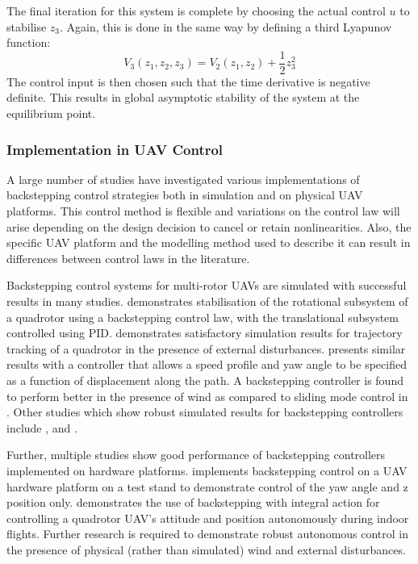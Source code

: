 The final iteration for this system is complete by choosing the actual control $u$ to stabilise $z_{3}$. Again, this is done in the same way by defining a third Lyapunov function:
\begin{equation*}
V_{3}(z_{1},z_{2},z_{3})=V_{2}(z_{1},z_{2})+\frac{1}{2}z_{3}^{2}
\end{equation*}
The control input is then chosen such that the time derivative is negative definite. This results in global asymptotic stability of the system at the equilibrium point.


\subsubsection{Implementation in UAV Control}

A large number of studies have investigated various implementations of backstepping control strategies both in simulation and on physical UAV platforms. This control method is flexible and variations on the control law will arise depending on the design decision to cancel or retain nonlinearities. Also, the specific UAV platform and the modelling method used to describe it can result in differences between control laws in the literature.

Backstepping control systems for multi-rotor UAVs are simulated with successful results in many studies. \cite{Mian2008} demonstrates stabilisation of the rotational subsystem of a quadrotor using a backstepping control law, with the translational subsystem controlled using PID. \cite{ArellanoMuro2013} demonstrates satisfactory simulation results for trajectory tracking of a quadrotor in the presence of external disturbances. \cite{Roza2012} presents similar results with a controller that allows a speed profile and yaw angle to be specified as a function of displacement along the path. A backstepping controller is found to perform better in the presence of wind as compared to sliding mode control in \cite{Moussid2015}. Other studies which show robust simulated results for backstepping controllers include \cite{Madani2006}, \cite{XuanMung2019} and \cite{Shao2018}.

Further, multiple studies show good performance of backstepping controllers implemented on hardware platforms. \cite{Madani2006a} implements backstepping control on a UAV hardware platform on a test stand to demonstrate control of the yaw angle and z position only. \cite{Bouabdallah2006} demonstrates the use of backstepping with integral action for controlling a quadrotor UAV's attitude and position autonomously during indoor flights. Further research is required to demonstrate robust autonomous control in the presence of physical (rather than simulated) wind and external disturbances. 



